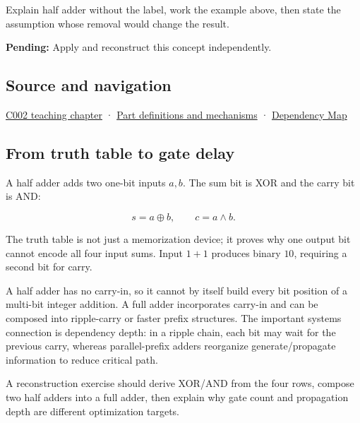 Explain half adder without the label, work the example above, then state the assumption whose removal would change the result.

\textbf{Pending:} Apply and reconstruct this concept independently.

\subsection{Source and navigation}\label{appendix-1652d27a8e90-source-and-navigation}

\hyperref[01-foundations-i-ch001-arithmetic-becomes-a-policy]{C002 teaching chapter} · \hyperref[appendix-fd090d982a15]{Part definitions and mechanisms} · \hyperref[appendix-4ad47bdd269a]{Dependency Map}

\subsection{From truth table to gate delay}\label{appendix-1652d27a8e90-from-truth-table-to-gate-delay}

A half adder adds two one-bit inputs \(a,b\). The sum bit is XOR and the carry bit is AND:

\[
s=a\oplus b,\qquad c=a\land b.
\]

The truth table is not just a memorization device; it proves why one output bit cannot encode all four input sums. Input \(1+1\) produces binary \(10\), requiring a second bit for carry.

A half adder has no carry-in, so it cannot by itself build every bit position of a multi-bit integer addition. A full adder incorporates carry-in and can be composed into ripple-carry or faster prefix structures. The important systems connection is dependency depth: in a ripple chain, each bit may wait for the previous carry, whereas parallel-prefix adders reorganize generate/propagate information to reduce critical path.

A reconstruction exercise should derive XOR/AND from the four rows, compose two half adders into a full adder, then explain why gate count and propagation depth are different optimization targets.
